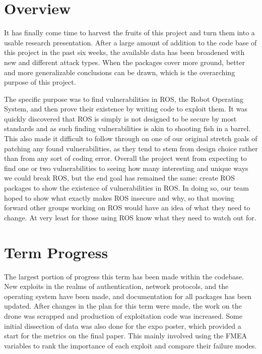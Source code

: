 \documentclass[IEEEtran,letterpaper,10pt,notitlepage,draftclsnofoot,onecolumn]{article}
\begin{document}
\newpage
{}
\tableofcontents
\clearpage

\section{Overview}
It has finally come time to harvest the fruits of this project and turn them into a usable research presentation.
After a large amount of addition to the code base of this project in the past six weeks, the available data has been broadened with new and different attack types.
When the packages cover more ground, better and more generalizable conclusions can be drawn, which is the overarching purpose of this project.

The specific purpose was to find vulnerabilities in ROS, the Robot Operating System, and then prove their existence by writing code to exploit them. 
It was quickly discovered that ROS is simply is not designed to be secure by most standards and as such finding vulnerabilities is akin to shooting fish in a barrel. 
This also made it difficult to follow through on one of our original stretch goals of patching any found vulnerabilities, as they tend to stem from design choice rather than from any sort of coding error. 
Overall the project went from expecting to find one or two vulnerabilities to seeing how many interesting and unique ways we could break ROS, but the end goal has remained the same: create ROS packages to show the existence of vulnerabilities in ROS. 
In doing so, our team hoped to show what exactly makes ROS insecure and why, so that moving forward other groups working on ROS would have an idea of what they need to change.
At very least for those using ROS know what they need to watch out for.

\section{Term Progress}
The largest portion of progress this term has been made within the codebase.
New exploits in the realms of authentication, network protocols, and the operating system have been made, and documentation for all packages has been updated.
After changes in the plan for this term were made, the work on the drone was scrapped and production of exploitation code was increased.
Some initial dissection of data was also done for the expo poster, which provided a start for the metrics on the final paper.
This mainly involved using the FMEA variables to rank the importance of each exploit and compare their failure modes.
\end{document}
